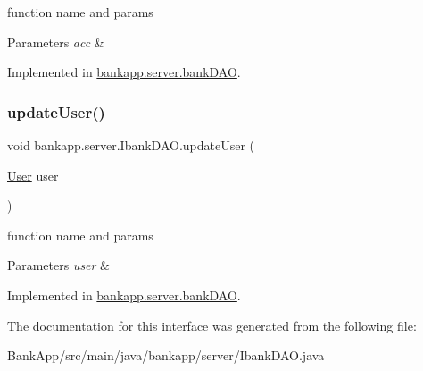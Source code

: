 function name and params 


\begin{DoxyParams}{Parameters}
{\em acc} & \\
\hline
\end{DoxyParams}


Implemented in \hyperlink{classbankapp_1_1server_1_1bankDAO_a22f03ae02432bc82af70d212a7a8cdba}{bankapp.\+server.\+bank\+D\+AO}.

\mbox{\label{interfacebankapp_1_1server_1_1IbankDAO_a5c38ce2000e71e9c9892bf2d357103bc}} 
\subsubsection{\texorpdfstring{update\+User()}{updateUser()}}
{\footnotesize\ttfamily void bankapp.\+server.\+Ibank\+D\+A\+O.\+update\+User (\begin{DoxyParamCaption}\item[{\hyperlink{classbankapp_1_1server_1_1User}{User}}]{user }\end{DoxyParamCaption})}



function name and params 


\begin{DoxyParams}{Parameters}
{\em user} & \\
\hline
\end{DoxyParams}


Implemented in \hyperlink{classbankapp_1_1server_1_1bankDAO_ab3ed5a9b972ea31ebc023596efecb2d1}{bankapp.\+server.\+bank\+D\+AO}.



The documentation for this interface was generated from the following file\+:\begin{DoxyCompactItemize}
\item 
Bank\+App/src/main/java/bankapp/server/Ibank\+D\+A\+O.\+java\end{DoxyCompactItemize}
